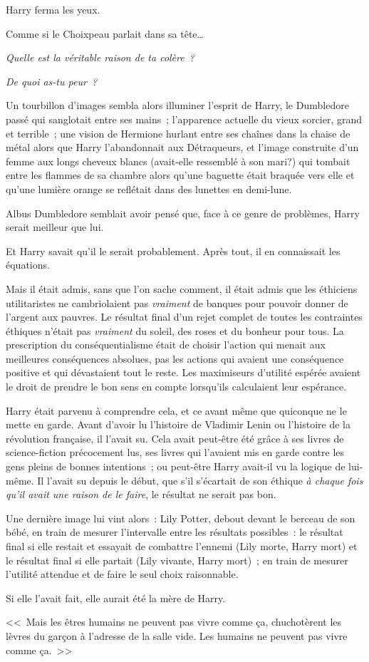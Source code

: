 Harry ferma les yeux.

Comme si le Choixpeau parlait dans sa tête…

\emph{Quelle est la véritable raison de ta colère~?}

\emph{De quoi as-tu peur~?}

Un tourbillon d'images sembla alors illuminer l'esprit de Harry, le Dumbledore passé qui sanglotait entre ses mains~; l'apparence actuelle du vieux sorcier, grand et terrible~; une vision de Hermione hurlant entre ses chaînes dans la chaise de métal alors que Harry l'abandonnait aux Détraqueurs, et l'image construite d'un femme aux longs cheveux blancs (avait-elle ressemblé à son mari?) qui tombait entre les flammes de sa chambre alors qu'une baguette était braquée vers elle et qu'une lumière orange se reflétait dans des lunettes en demi-lune.

Albus Dumbledore semblait avoir pensé que, face à ce genre de problèmes, Harry serait meilleur que lui.

Et Harry savait qu'il le serait probablement. Après tout, il en connaissait les équations.

Mais il était admis, sans que l'on sache comment, il était admis que les éthiciens utilitaristes ne cambriolaient pas \emph{vraiment} de banques pour pouvoir donner de l'argent aux pauvres. Le résultat final d'un rejet complet de toutes les contraintes éthiques n'était pas \emph{vraiment} du soleil, des roses et du bonheur pour tous. La prescription du conséquentialisme était de choisir l'action qui menait aux meilleures conséquences absolues, pas les actions qui avaient une conséquence positive et qui dévastaient tout le reste. Les maximiseurs d'utilité espérée avaient le droit de prendre le bon sens en compte lorsqu'ils calculaient leur espérance.

Harry était parvenu à comprendre cela, et ce avant même que quiconque ne le mette en garde. Avant d'avoir lu l'histoire de Vladimir Lenin ou l'histoire de la révolution française, il l'avait su. Cela avait peut-être été grâce à ses livres de science-fiction précocement lus, ses livres qui l'avaient mis en garde contre les gens pleins de bonnes intentions~; ou peut-être Harry avait-il vu la logique de lui-même. Il l'avait su depuis le début, que s'il s'écartait de son éthique \emph{à chaque fois qu'il avait une raison de le faire}, le résultat ne serait pas bon.

Une dernière image lui vint alors~: Lily Potter, debout devant le berceau de son bébé, en train de mesurer l'intervalle entre les résultats possibles~: le résultat final si elle restait et essayait de combattre l'ennemi (Lily morte, Harry mort) et le résultat final si elle partait (Lily vivante, Harry mort)~; en train de mesurer l'utilité attendue et de faire le seul choix raisonnable.

Si elle l'avait fait, elle aurait été la mère de Harry.

<<~Mais les êtres humains ne peuvent pas vivre comme ça, chuchotèrent les lèvres du garçon à l'adresse de la salle vide. Les humains ne peuvent pas vivre comme ça.~>>
